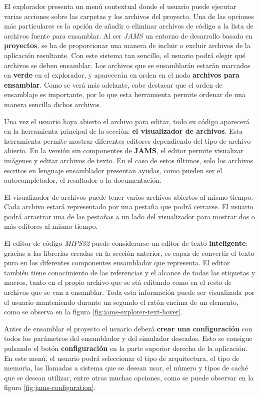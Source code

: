 El explorador presenta un menú contextual donde el usuario
puede ejecutar varias acciones sobre las carpetas y los archivos
del proyecto.
Una de las opciones más particulares es la opción de añadir o eliminar
archivos de código a la lista de archivos fuente para ensamblar.
Al ser \textit{JAMS} un entorno de desarrollo basado en \textbf{proyectos},
se ha de proporcionar una manera de incluir o excluir archivos de
la aplicación resultante.
Con este sistema tan sencillo, el usuario podrá elegir qué archivos se deben ensamblar.
Los archivos que se ensamblarán estarán marcados en \textbf{verde} en el explorador,
y aparecerán en orden en el nodo \textbf{archivos para ensamblar}.
Como se verá más adelante, cabe destacar que el orden de ensamblaje
es importante, por lo que esta herramienta permite ordenar de una manera
sencilla dichos archivos.

Una vez el usuario haya abierto el archivo para editar, todo su código
aparecerá en la herramienta principal de la sección: \textbf{el visualizador
de archivos}.
Esta herramienta permite mostrar diferentes editores dependiendo del tipo
de archivo abierto.
En la versión sin componentes de \textbf{JAMS}, el editor permite visualizar
imágenes y editar archivos de texto.
En el caso de estos últimos, solo los archivos escritos en
lenguaje ensamblador presentan ayudas, como pueden ser el autocompletador,
el resaltador o la documentación.

El visualizador de archivos puede tener varios archivos abiertos
al mismo tiempo.
Cada archivo estará representado por una pestaña que podrá cerrarse.
El usuario podrá arrastrar una de las pestañas a un lado del visualizador
para mostrar dos o más editores al mismo tiempo.

El editor de código \textit{MIPS32} puede considerarse un editor
de texto \textbf{inteligente}: gracias a las librerías creadas en la sección
anterior, es capaz de convertir el texto puro en los diferentes componentes
ensamblador que representa.
El editor también tiene conocimiento de las referencias y el alcance de
todas las etiquetas y macros, tanto en el propio archivo que se stá editando
como en el resto de archivos que se van a ensamblar.
Toda esta información puede ser visualizada por el usuario manteniendo
durante un segundo el ratón encima de un elemento, como se observa
en la figura \ref{fig:jams-explorer-text-hover}.

Antes de ensamblar el proyecto el usuario deberá \textbf{crear una configuración}
con todos los parámetros del ensamblador y del simulador deseados.
Esto se consigue pulsando el botón \textbf{configuración} en la parte
superior derecha de la aplicación.
En este menú, el usuario podrá seleccionar el tipo de arquitectura,
el tipo de memoria, las llamadas a sistema que se desean usar,
 el número y tipos de caché que se desean utilizar, entre otras
muchas opciones, como se puede observar en la figura \ref{fig:jams-configuration}.

